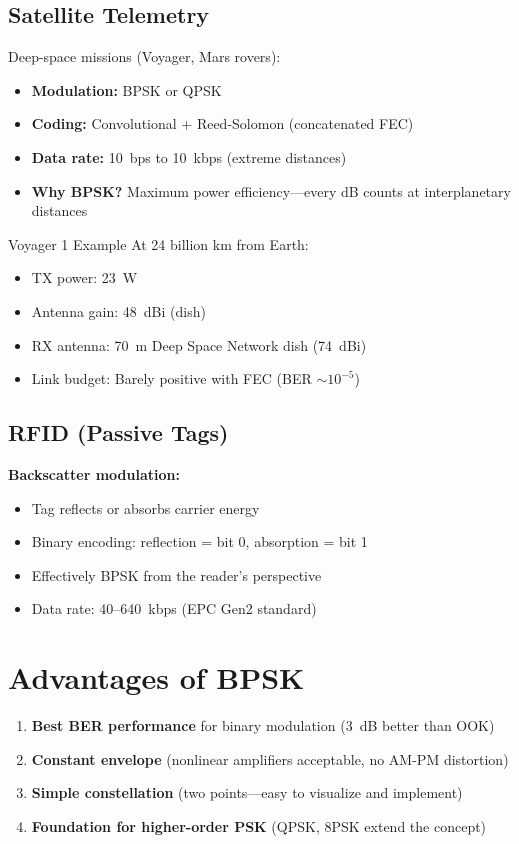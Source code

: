 \subsection{Satellite Telemetry}

Deep-space missions (Voyager, Mars rovers):
\begin{itemize}
\item \textbf{Modulation:} BPSK or QPSK
\item \textbf{Coding:} Convolutional + Reed-Solomon (concatenated FEC)
\item \textbf{Data rate:} 10~bps to 10~kbps (extreme distances)
\item \textbf{Why BPSK?} Maximum power efficiency---every dB counts at interplanetary distances
\end{itemize}

\begin{calloutbox}[colback=blue!5!white,colframe=blue!75!black]{ Voyager 1 Example}
At 24 billion km from Earth:
\begin{itemize}
\item TX power: 23~W
\item Antenna gain: 48~dBi (dish)
\item RX antenna: 70~m Deep Space Network dish (74~dBi)
\item Link budget: Barely positive with FEC (BER $\sim 10^{-5}$)
\end{itemize}
\end{calloutbox}

\subsection{RFID (Passive Tags)}

\textbf{Backscatter modulation:}
\begin{itemize}
\item Tag reflects or absorbs carrier energy
\item Binary encoding: reflection = bit 0, absorption = bit 1
\item Effectively BPSK from the reader's perspective
\item Data rate: 40--640~kbps (EPC Gen2 standard)
\end{itemize}

\section{Advantages of BPSK}

\begin{enumerate}
\item \textbf{Best BER performance} for binary modulation (3~dB better than OOK)
\item \textbf{Constant envelope} (nonlinear amplifiers acceptable, no AM-PM distortion)
\item \textbf{Simple constellation} (two points---easy to visualize and implement)
\item \textbf{Foundation for higher-order PSK} (QPSK, 8PSK extend the concept)
\end{enumerate}

